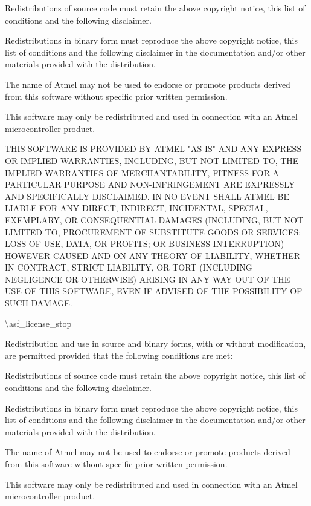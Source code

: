 \begin{DoxyEnumerate}
\item Redistributions of source code must retain the above copyright notice, this list of conditions and the following disclaimer.
\item Redistributions in binary form must reproduce the above copyright notice, this list of conditions and the following disclaimer in the documentation and/\+or other materials provided with the distribution.
\item The name of Atmel may not be used to endorse or promote products derived from this software without specific prior written permission.
\item This software may only be redistributed and used in connection with an Atmel microcontroller product.
\end{DoxyEnumerate}

THIS SOFTWARE IS PROVIDED BY ATMEL "{}\+AS IS"{} AND ANY EXPRESS OR IMPLIED WARRANTIES, INCLUDING, BUT NOT LIMITED TO, THE IMPLIED WARRANTIES OF MERCHANTABILITY, FITNESS FOR A PARTICULAR PURPOSE AND NON-\/\+INFRINGEMENT ARE EXPRESSLY AND SPECIFICALLY DISCLAIMED. IN NO EVENT SHALL ATMEL BE LIABLE FOR ANY DIRECT, INDIRECT, INCIDENTAL, SPECIAL, EXEMPLARY, OR CONSEQUENTIAL DAMAGES (INCLUDING, BUT NOT LIMITED TO, PROCUREMENT OF SUBSTITUTE GOODS OR SERVICES; LOSS OF USE, DATA, OR PROFITS; OR BUSINESS INTERRUPTION) HOWEVER CAUSED AND ON ANY THEORY OF LIABILITY, WHETHER IN CONTRACT, STRICT LIABILITY, OR TORT (INCLUDING NEGLIGENCE OR OTHERWISE) ARISING IN ANY WAY OUT OF THE USE OF THIS SOFTWARE, EVEN IF ADVISED OF THE POSSIBILITY OF SUCH DAMAGE.

\textbackslash{}asf\+\_\+license\+\_\+stop

Redistribution and use in source and binary forms, with or without modification, are permitted provided that the following conditions are met:\+


\begin{DoxyEnumerate}
\item Redistributions of source code must retain the above copyright notice, this list of conditions and the following disclaimer.
\item Redistributions in binary form must reproduce the above copyright notice, this list of conditions and the following disclaimer in the documentation and/\+or other materials provided with the distribution.
\item The name of Atmel may not be used to endorse or promote products derived from this software without specific prior written permission.
\item This software may only be redistributed and used in connection with an Atmel microcontroller product.
\end{DoxyEnumerate}

